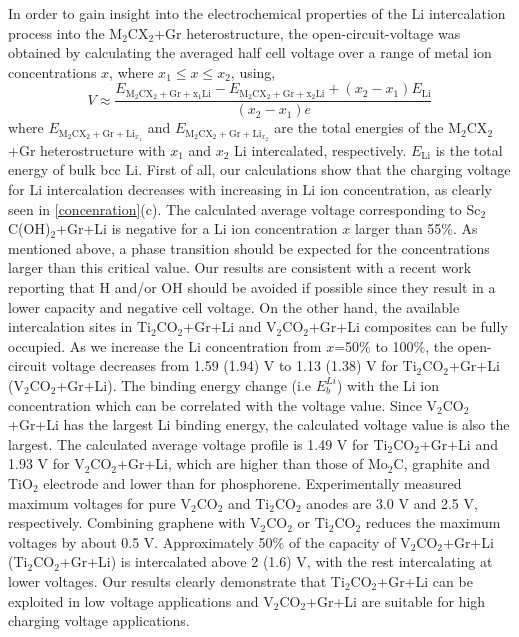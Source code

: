 In order to gain insight into the electrochemical properties of the Li intercalation process into the M$_2$CX$_2$+Gr heterostructure, the open-circuit-voltage was obtained by calculating the averaged half cell voltage over a range of metal ion concentrations $x$, where $x_1\leq x\leq x_2$, using,
\begin{equation}
V\approx\frac{E_{\mathrm{M}_2\mathrm{C}\mathrm{X}_2+\mathrm{Gr}+\mathrm{x_1Li}}-E_{\mathrm{M}_2\mathrm{C}\mathrm{X}_2+\mathrm{Gr}+\mathrm{x_2Li}}+(x_2-x_1)E_{\mathrm{Li}}}{(x_2-x_1)e}
\end{equation}
where $E_{\mathrm{M}_2\mathrm{C}\mathrm{X}_2+\mathrm{Gr}+\mathrm{Li}_{x_1}}$ and $E_{\mathrm{M}_2\mathrm{C}\mathrm{X}_2+\mathrm{Gr}+\mathrm{Li}_{x_2}}$ are the total energies of the M$_2$CX$_2$+Gr heterostructure with $x_1$ and $x_2$ Li intercalated, respectively.  $E_{\mathrm{Li}}$ is the total energy of bulk bcc Li.  First of all, our calculations show that the charging voltage for Li intercalation decreases with increasing in Li ion concentration, as clearly seen in \autoref{concenration}(c). The calculated average voltage corresponding to Sc$_2$C(OH)$_2$+Gr+Li is negative for a Li ion concentration $x$ larger than 55\%. As mentioned above, a phase transition should be expected for the concentrations larger than this critical value. Our results are consistent with a recent work reporting that H and/or OH should be avoided if possible since they result in a lower capacity and negative cell voltage\cite{Xie2014,Tang2012}. On the other hand, the available intercalation sites in Ti$_2$CO$_2$+Gr+Li and V$_2$CO$_2$+Gr+Li composites can be fully occupied.
As we increase the Li concentration from $x$=50\% to 100\%, the open-circuit voltage decreases from 1.59 (1.94) V to 1.13 (1.38) V for Ti$_2$CO$_2$+Gr+Li (V$_2$CO$_2$+Gr+Li). The binding energy change (i.e $E_{b}^{Li}$) with the Li ion concentration which can be correlated with the voltage value. Since V$_2$CO$_2$+Gr+Li has the largest Li binding energy, the calculated voltage value is also the largest. The calculated average voltage profile is 1.49 V for Ti$_2$CO$_2$+Gr+Li and 1.93 V for V$_2$CO$_2$+Gr+Li, which are higher than those of Mo$_2$C\cite{C6TA01918H}, graphite\cite{ceder4} and TiO$_2$ electrode \cite{tio2-voltage} and lower than for phosphorene\cite{doi:10.1021/nl504336h}. Experimentally measured maximum voltages for pure V$_2$CO$_2$ and Ti$_2$CO$_2$ anodes are 3.0 V and 2.5 V, respectively\cite{doi:10.1021/ja405735d,gdgdgd}. Combining graphene with V$_2$CO$_2$ or Ti$_2$CO$_2$ reduces the maximum voltages by about 0.5 V.  Approximately 50\% of the capacity of V$_2$CO$_2$+Gr+Li (Ti$_2$CO$_2$+Gr+Li) is intercalated above 2 (1.6) V, with the rest intercalating at lower voltages. Our results clearly demonstrate that Ti$_2$CO$_2$+Gr+Li can be exploited in low voltage applications and V$_2$CO$_2$+Gr+Li are suitable for high charging voltage applications.

